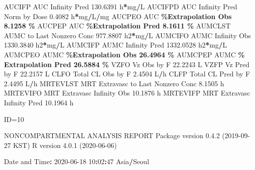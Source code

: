 \documentclass[
  10pt,
]{krantz}
\makeatletter
\newenvironment{Shaded}{\begin{snugshade}}{\end{snugshade}}
\newcommand{\DecValTok}[1]{\textcolor[rgb]{0.00,0.00,0.81}{#1}}
\newcommand{\FloatTok}[1]{\textcolor[rgb]{0.00,0.00,0.81}{#1}}
\newcommand{\NormalTok}[1]{#1}
\newcommand{\OperatorTok}[1]{\textcolor[rgb]{0.81,0.36,0.00}{\textbf{#1}}}
\newcommand{\StringTok}[1]{\textcolor[rgb]{0.31,0.60,0.02}{#1}}
\newenvironment{kframe}{%
\medskip{}
\setlength{\fboxsep}{.8em}
 \def\at@end@of@kframe{}%
 \ifinner\ifhmode%
  \def\at@end@of@kframe{\end{minipage}}%
  \begin{minipage}{\columnwidth}%
 \fi\fi%
 \def\FrameCommand##1{\hskip\@totalleftmargin \hskip-\fboxsep
 \colorbox{shadecolor}{##1}\hskip-\fboxsep
     \hskip-\linewidth \hskip-\@totalleftmargin \hskip\columnwidth}%
 \MakeFramed {\advance\hsize-\width
   \@totalleftmargin\z@ \linewidth\hsize
   \@setminipage}}%
 {\par\unskip\endMakeFramed%
 \at@end@of@kframe}
\renewenvironment{Shaded}{\begin{kframe}}{\end{kframe}}
\makeatother
\begin{document}
\begin{Shaded}
\begin{Highlighting}[]
\NormalTok{AUCIFP     AUC Infinity Pred                             }\FloatTok{130.6391}\NormalTok{ h}\OperatorTok{*}\NormalTok{mg}\OperatorTok{/}\NormalTok{L}
\NormalTok{AUCIFPD    AUC Infinity Pred Norm by Dose                  }\FloatTok{0.4082}\NormalTok{ h}\OperatorTok{*}\NormalTok{mg}\OperatorTok{/}\NormalTok{L}\OperatorTok{/}\NormalTok{mg}
\NormalTok{AUCPEO     AUC }\OperatorTok{\%Extrapolation Obs                          8.1258 \%}
\NormalTok{AUCPEP     AUC }\OperatorTok{\%Extrapolation Pred                         8.1611 \%}
\NormalTok{AUMCLST    AUMC to Last Nonzero Conc                     }\FloatTok{977.8807}\NormalTok{ h2}\OperatorTok{*}\NormalTok{mg}\OperatorTok{/}\NormalTok{L}
\NormalTok{AUMCIFO    AUMC Infinity Obs                            }\FloatTok{1330.3840}\NormalTok{ h2}\OperatorTok{*}\NormalTok{mg}\OperatorTok{/}\NormalTok{L}
\NormalTok{AUMCIFP    AUMC Infinity Pred                           }\FloatTok{1332.0528}\NormalTok{ h2}\OperatorTok{*}\NormalTok{mg}\OperatorTok{/}\NormalTok{L}
\NormalTok{AUMCPEO    AUMC }\OperatorTok{\%Extrapolation Obs                        26.4964 \%}
\NormalTok{AUMCPEP    AUMC }\OperatorTok{\% Extrapolation Pred                      26.5884 \%}
\NormalTok{VZFO       Vz Obs by F                                    }\FloatTok{22.2243}\NormalTok{ L}
\NormalTok{VZFP       Vz Pred by F                                   }\FloatTok{22.2157}\NormalTok{ L}
\NormalTok{CLFO       Total CL Obs by F                               }\FloatTok{2.4504}\NormalTok{ L}\OperatorTok{/}\NormalTok{h}
\NormalTok{CLFP       Total CL Pred by F                              }\FloatTok{2.4495}\NormalTok{ L}\OperatorTok{/}\NormalTok{h}
\NormalTok{MRTEVLST   MRT Extravasc to Last Nonzero Conc              }\FloatTok{8.1505}\NormalTok{ h}
\NormalTok{MRTEVIFO   MRT Extravasc Infinity Obs                     }\FloatTok{10.1876}\NormalTok{ h}
\NormalTok{MRTEVIFP   MRT Extravasc Infinity Pred                    }\FloatTok{10.1964}\NormalTok{ h}





\NormalTok{ID=}\DecValTok{10}

\NormalTok{                        NONCOMPARTMENTAL ANALYSIS REPORT}
\NormalTok{                       Package version }\DecValTok{0}\NormalTok{.}\FloatTok{4.2}\NormalTok{ (}\DecValTok{2019{-}09{-}27}\NormalTok{ KST)}
\NormalTok{                          R version }\DecValTok{4}\NormalTok{.}\FloatTok{0.1}\NormalTok{ (}\DecValTok{2020{-}06{-}06}\NormalTok{)}

\NormalTok{Date and Time}\OperatorTok{:}\StringTok{ }\DecValTok{2020{-}06{-}18} \DecValTok{10}\OperatorTok{:}\DecValTok{02}\OperatorTok{:}\DecValTok{47}\NormalTok{ Asia}\OperatorTok{/}\NormalTok{Seoul}


\end{Highlighting}
\end{Shaded}
\end{document}
